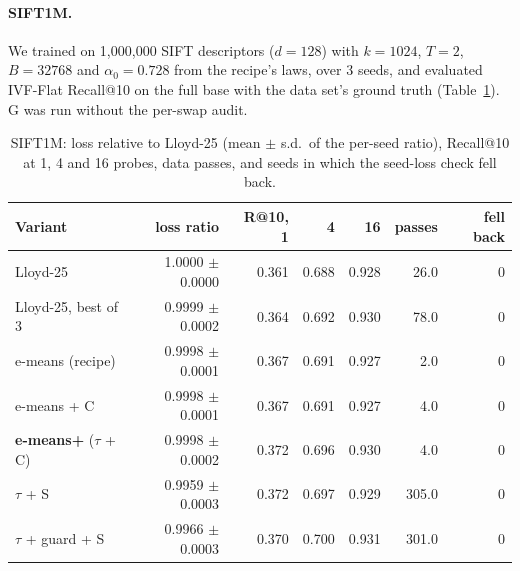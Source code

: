 \paragraph{SIFT1M.} We trained on 1{,}000,000 SIFT descriptors ($d=128$) with $k=1024$,
$T=2$, $B=32768$ and $\alpha_0=0.728$ from the recipe's laws, over 3 seeds,
and evaluated IVF-Flat Recall@10 on the full base with the data set's ground truth
(Table~\ref{tab:sift}). G was run without the per-swap audit.

\begin{table}[t]
\centering
\small
\caption{SIFT1M: loss relative to Lloyd-25 (mean $\pm$ s.d.\ of the per-seed ratio), Recall@10 at 1, 4
and 16 probes, data passes, and seeds in which the seed-loss check fell back.}\label{tab:sift}
\begin{tabular}{lrrrrrr}
\toprule
Variant & loss ratio & R@10, 1 & 4 & 16 & passes & fell back\\
\midrule
Lloyd-25 & 1.0000 {\scriptsize $\pm$0.0000} & 0.361 & 0.688 & 0.928 & 26.0 & 0 \\
Lloyd-25, best of 3 & 0.9999 {\scriptsize $\pm$0.0002} & 0.364 & 0.692 & 0.930 & 78.0 & 0 \\
e-means (recipe) & 0.9998 {\scriptsize $\pm$0.0001} & 0.367 & 0.691 & 0.927 & 2.0 & 0 \\
e-means + C & 0.9998 {\scriptsize $\pm$0.0001} & 0.367 & 0.691 & 0.927 & 4.0 & 0 \\
\textbf{e-means+} ($\tau$ + C) & 0.9998 {\scriptsize $\pm$0.0002} & 0.372 & 0.696 & 0.930 & 4.0 & 0 \\
$\tau$ + S & 0.9959 {\scriptsize $\pm$0.0003} & 0.372 & 0.697 & 0.929 & 305.0 & 0 \\
$\tau$ + guard + S & 0.9966 {\scriptsize $\pm$0.0003} & 0.370 & 0.700 & 0.931 & 301.0 & 0 \\
\bottomrule
\end{tabular}
\end{table}
